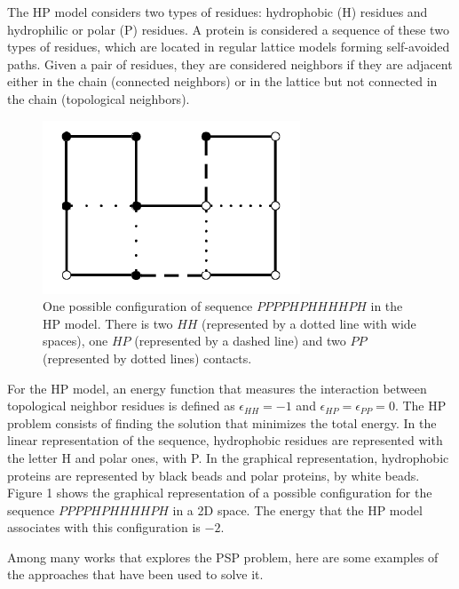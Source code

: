 \documentclass[conference]{IEEEtran}
\begin{document}
The HP model considers two types of residues:  hydrophobic (H) residues  and hydrophilic or polar (P) residues. A protein is considered a sequence of these two types of residues, which are located in regular lattice models forming self-avoided paths. Given a pair of residues, they are considered neighbors if they are adjacent  either in the chain (connected neighbors) or  in the lattice but not connected in the chain (topological neighbors).


\begin{figure}[htb!] \label{fig:PROTEXAM}
	\centering
	\includegraphics[scale=0.7]{figures/proteinExample.png}
	\caption{One possible configuration of  sequence $PPPPHPHHHHPH$ in the HP model. There is two $HH$ (represented by a dotted line with wide spaces), one $HP$ (represented by a dashed line) and  two $PP$  (represented by dotted lines) contacts.}
\end{figure}




For the HP model, an energy function that  measures the interaction between topological  neighbor residues is defined  as  $\epsilon_{HH}=-1$ and $\epsilon_{HP}=\epsilon_{PP}=0$. The HP problem consists of finding the solution that minimizes the total energy. In the linear representation of the sequence, hydrophobic residues are represented with the letter H and polar ones, with P. In the graphical representation, hydrophobic proteins are represented  by black beads and polar proteins, by white beads.  Figure 1 shows the graphical representation of a possible configuration for  the sequence  $PPPPHPHHHHPH$ in a 2D space. The energy that the HP model associates with this configuration is $-2$.


Among many works that explores the PSP problem, here are some examples of the approaches that have been used to solve it.

%
\end{document}
